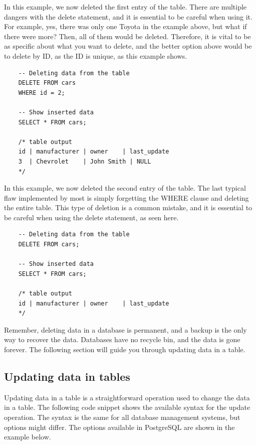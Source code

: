 In this example, we now deleted the first entry of the table. There are multiple dangers with the delete statement, and it is essential to be careful when using it. For example, yes, there was only one Toyota in the example above, but what if there were more? Then, all of them would be deleted. Therefore, it is vital to be as specific about what you want to delete, and the better option above would be to delete by ID, as the ID is unique, as this example shows.

\begin{verbatim}
    -- Deleting data from the table
    DELETE FROM cars
    WHERE id = 2;

    -- Show inserted data
    SELECT * FROM cars;

    /* table output
    id | manufacturer | owner    | last_update
    3  | Chevrolet    | John Smith | NULL
    */
\end{verbatim}

In this example, we now deleted the second entry of the table. The last typical flaw implemented by most is simply forgetting the WHERE clause and deleting the entire table. This type of deletion is a common mistake, and it is essential to be careful when using the delete statement, as seen here.

\begin{verbatim}
    -- Deleting data from the table
    DELETE FROM cars;

    -- Show inserted data
    SELECT * FROM cars;

    /* table output
    id | manufacturer | owner    | last_update
    */
\end{verbatim}

Remember, deleting data in a database is permanent, and a backup is the only way to recover the data. Databases have no recycle bin, and the data is gone forever. The following section will guide you through updating data in a table.

\subsection{Updating data in tables}
Updating data in a table is a straightforward operation used to change the data in a table. The following code snippet shows the available syntax for the update operation. The syntax is the same for all database management systems, but options might differ. The options available in PostgreSQL are shown in the example below.

